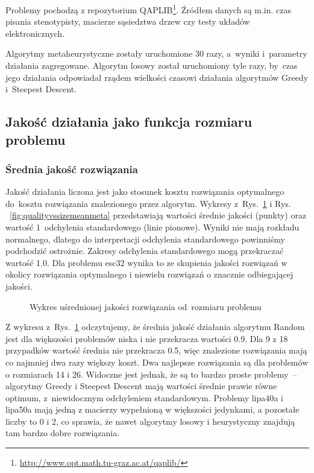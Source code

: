 \documentclass[a4paper,10pt]{article}
\begin{document}
Problemy pochodzą z repozytorium QAPLIB\footnote{\url{http://www.opt.math.tu-graz.ac.at/qaplib/}}.
Źródłem danych są m.in. czas pisania stenotypisty, macierze sąsiedztwa drzew czy testy układów elektronicznych.

Algorytmy metaheurystyczne zostały uruchomione 30 razy, a~wyniki i~parametry działania zagregowane. 
Algorytm losowy został uruchomiony tyle razy, by~czas jego działania odpowiadał rządem wielkości czasowi działania algorytmów Greedy i~Steepest Descent.

\subsection{Jakość działania jako funkcja rozmiaru problemu}
\subsubsection{Średnia jakość rozwiązania}
Jakość działania liczona jest jako stosunek kosztu rozwiązania optymalnego do~kosztu rozwiązania znalezionego przez
algorytm.
Wykresy z~Rys.~\ref{fig:qualityvssizemean} i Rys. ~\ref{fig:qualityvssizemeanmeta} przedstawiają wartości średnie jakości (punkty) oraz wartość 1~odchylenia standardowego (linie pionowe).
Wyniki nie mają rozkładu normalnego, dlatego do interpretacji odchylenia standardowego powinniśmy podchodzić ostrożnie.
Zakresy odchylenia standardowego mogą przekraczać wartość \num{1.0}.
Dla problemu esc32 wynika to ze skupienia jakości rozwiązań w okolicy rozwiązania optymalnego i niewielu rozwiązań o znacznie odbiegającej jakości.

\begin{figure}[!htpb]
\begin{center}

\caption{Wykres uśrednionej jakości rozwiązania od~rozmiaru problemu}
\label{fig:qualityvssizemean}
\end{center}
\end{figure}

Z wykresu z~Rys.~\ref{fig:qualityvssizemean} odczytujemy, że średnia jakość działania algorytmu Random jest dla większości problemów niska i nie przekracza wartości \num{0.9}.  
Dla 9 z 18 przypadków wartość średnia nie przekracza \num{0.5}, więc znalezione rozwiązania mają co najmniej dwa razy większy koszt.
Dwa najlepsze rozwiązania są dla problemów o rozmiarach 14 i 26.
Widoczne jest jednak, że są to bardzo proste problemy~-- algorytmy Greedy i Steepest Descent mają wartości średnie prawie równe optimum,
z~niewidocznym odchyleniem standardowym.
Problemy lipa40a i lipa50a mają jedną z macierzy wypełnioną w większości jedynkami, a pozostałe liczby to 0 i 2, co sprawia, że nawet algorytmy losowy i heurystyczny znajdują tam bardzo dobre rozwiązania.
\end{document}
